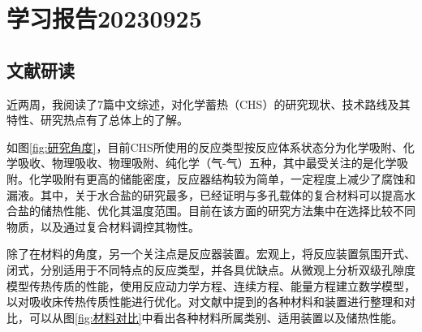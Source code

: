 \documentclass[oneside]{report}
\begin{document}
\chapter*{学习报告20230925}

\section*{文献研读}
近两周，我阅读了7篇中文综述，对化学蓄热（CHS）的研究现状、技术路线及其特性、研究热点有了总体上的了解。

如图\ref{fig:研究角度}，目前CHS所使用的反应类型按反应体系状态分为化学吸附、化学吸收、物理吸收、物理吸附、纯化学（气-气）五种，其中最受关注的是化学吸附。化学吸附有更高的储能密度，反应器结构较为简单，一定程度上减少了腐蚀和漏液。其中，关于水合盐的研究最多，已经证明与多孔载体的复合材料可以提高水合盐的储热性能、优化其温度范围。目前在该方面的研究方法集中在选择比较不同物质，以及通过复合材料调控其物性。

除了在材料的角度，另一个关注点是反应器装置。宏观上，将反应装置氛围开式、闭式，分别适用于不同特点的反应类型，并各具优缺点。从微观上分析双级孔隙度模型传热传质的性能，使用反应动力学方程、连续方程、能量方程建立数学模型，以对吸收床传热传质性能进行优化。对文献中提到的各种材料和装置进行整理和对比，可以从图\ref{fig:材料对比}中看出各种材料所属类别、适用装置以及储热性能。
\end{document}

